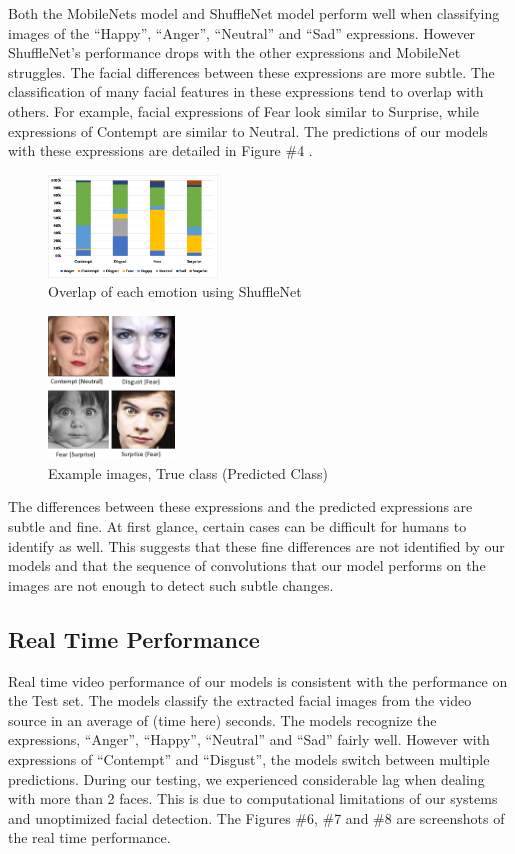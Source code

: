 \documentclass[10pt,twocolumn,letterpaper]{article}
\begin{document}
Both the MobileNets model and ShuffleNet model perform well when classifying images of the “Happy”, “Anger”, “Neutral” and “Sad” expressions. However ShuffleNet’s performance drops with the other expressions and MobileNet struggles.
The facial differences between these expressions are more subtle. The classification of many facial features in these expressions tend to overlap with others. For example, facial expressions of Fear look similar to Surprise, while expressions of Contempt are similar to Neutral. The predictions of our models with these expressions are detailed in Figure \#4 .

\begin{figure}[ht]
\caption{Overlap of each emotion using ShuffleNet}
\centering
\includegraphics[width=0.4\textwidth]{Predicted}
\end{figure}

\begin{figure}[ht]
\caption{Example images, True class (Predicted Class)}
\centering
\includegraphics[width=0.3\textwidth]{emotions}
\end{figure}

The differences between these expressions and the predicted expressions are subtle and fine. At first glance, certain cases can be difficult for humans to identify as well.
This suggests that these fine differences are not identified by our models and that the sequence of convolutions that our model performs on the images are not enough to detect such subtle changes.

\subsection{Real Time Performance}
Real time video performance of our models is consistent with the performance on the Test set. The models classify the extracted facial images from the video source in an average of (time here) seconds. The models recognize the expressions, “Anger”, “Happy”, “Neutral” and “Sad” fairly well. However with expressions of “Contempt” and “Disgust”, the models switch between multiple predictions. During our testing, we experienced considerable lag when dealing with more than 2 faces. This is due to computational limitations of our systems and unoptimized facial detection. The Figures \#6, \#7  and \#8 are screenshots of the real time performance.
\end{document}
